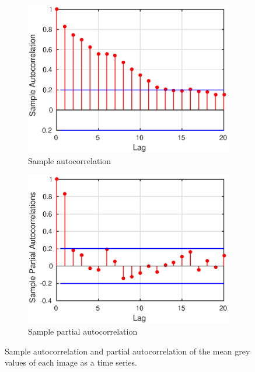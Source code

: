 \documentclass[12pt]{report}
\begin{document}
\begin{figure}[p]
	\centering
	\begin{subfigure}[b]{0.45\textwidth}
		\includegraphics[width=1\textwidth]{figures/initial_acf.eps}
		\caption{Sample autocorrelation}
	\end{subfigure}
	\begin{subfigure}[b]{0.45\textwidth}
		\includegraphics[width=1\textwidth]{figures/initial_pacf.eps}
		\caption{Sample partial autocorrelation}
	\end{subfigure}
	\caption{Sample autocorrelation and partial autocorrelation of the mean grey values of each image as a time series.}
	\label{fig:timeSeries_acf_pacf}
\end{figure}
\end{document}
